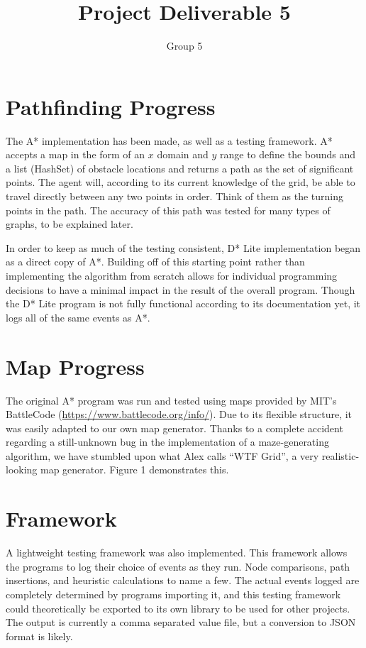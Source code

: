 \documentclass{article}
\begin{document}
\title{Project Deliverable 5}
\author{Group 5}
\date{}
\maketitle

\section{Pathfinding Progress}

The A* implementation has been made, as well as a testing framework. A* 
accepts a map in the form of an $x$ domain and $y$ range to define the bounds
and a list (HashSet) of obstacle locations and returns a path as the set of
significant points. The agent will, according to its current knowledge of the
grid, be able to travel directly between any two points in order. Think of them
as the turning points in the path. The accuracy of this path was tested for
many types of graphs, to be explained later.

In order to keep as much of the testing consistent, D* Lite implementation
began as a direct copy of A*. Building off of this starting point rather than
implementing the algorithm from scratch allows for individual programming
decisions to have a minimal impact in the result of the overall program. Though
the D* Lite program is not fully functional according to its documentation yet,
it logs all of the same events as A*.

\section{Map Progress}

The original A* program was run and tested using maps provided by MIT's
BattleCode (\url{https://www.battlecode.org/info/}). Due to its flexible structure, 
it was easily adapted to our own map generator. Thanks to a complete accident 
regarding a still-unknown bug in the implementation of a maze-generating algorithm, 
we have stumbled upon what Alex calls ``WTF Grid'', a very realistic-looking map generator.
Figure 1 demonstrates this.

\section{Framework}

A lightweight testing framework was also implemented. This framework allows
the programs to log their choice of events as they run. Node comparisons,
path insertions, and heuristic calculations to name a few. The actual
events logged are completely determined by programs importing it, and this
testing framework could theoretically be exported to its own library to be
used for other projects. The output is currently a comma separated value
file, but a conversion to JSON format is likely.
\end{document}
